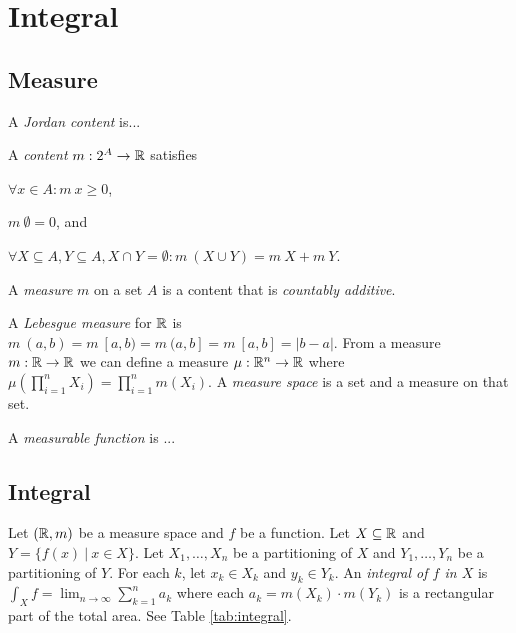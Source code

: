 \chapter{Integral}

\section{Measure}

A \emph{Jordan content} is...

%
A \emph{content} \(m : 2^A \to \mathbb{R}\) satisfies
\begin{enumerate*}[label={(\arabic*)}]
    \item \(\forall x \in A : m~x \ge 0\),
    \item \(m~\emptyset = 0\), and
    \item \(\forall X \subseteq A, Y \subseteq A, X \cap Y = \emptyset : m~(X \cup Y) = m~X + m~Y\).
\end{enumerate*}

%
%
%
A \emph{measure} \(m\) on a set \(A\) is a content that is \emph{countably additive}.

%
%
A \emph{Lebesgue measure} for \(\mathbb{R}\) is
\(m~(a,b) = m~[a,b) = m~(a,b] = m~[a,b] = |b-a|\).
From a measure \(m : \mathbb{R} \to \mathbb{R}\)
we can define a measure \(\mu : \mathbb{R}^n \to \mathbb{R}\)
where
\(\mu \left( \prod_{i=1}^n X_i \right) = \prod_{i=1}^n m(X_i)\).
%
%
%
A \emph{measure space} is a set and a measure on that set.

%
%
A \emph{measurable function} is ...

\section{Integral}

%
%
%
%
%
Let \((\mathbb{R},m)\) be a measure space and \(f\) be a function.
Let \(X \subseteq \mathbb{R}\) and \(Y = \{ f(x) ~|~ x \in X\}\).
Let \(X_1,\ldots,X_n\) be a partitioning of \(X\) and \(Y_1,\ldots,Y_n\) be a partitioning of \(Y\).
For each \(k\), let \(x_k \in X_k\) and \(y_k \in Y_k\).
An \emph{integral of \(f\) in \(X\)}
is \(\int_X f = \lim_{n\to\infty} \sum_{k=1}^{n} a_k\)
where each \(a_k = m(X_k) \cdot m(Y_k)\) is a rectangular part of the total area.
See Table \ref{tab:integral}.

